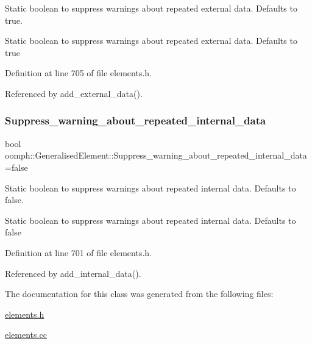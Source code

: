 Static boolean to suppress warnings about repeated external data. Defaults to true. 

Static boolean to suppress warnings about repeated external data. Defaults to true 

Definition at line 705 of file elements.\+h.



Referenced by add\+\_\+external\+\_\+data().

\mbox{\label{classoomph_1_1GeneralisedElement_acbfce11cb0f35821b108be5ec48c76d6}} 
\subsubsection{\texorpdfstring{Suppress\+\_\+warning\+\_\+about\+\_\+repeated\+\_\+internal\+\_\+data}{Suppress\_warning\_about\_repeated\_internal\_data}}
{\footnotesize\ttfamily bool oomph\+::\+Generalised\+Element\+::\+Suppress\+\_\+warning\+\_\+about\+\_\+repeated\+\_\+internal\+\_\+data =false\hspace{0.3cm}{\ttfamily [static]}}



Static boolean to suppress warnings about repeated internal data. Defaults to false. 

Static boolean to suppress warnings about repeated internal data. Defaults to false 

Definition at line 701 of file elements.\+h.



Referenced by add\+\_\+internal\+\_\+data().



The documentation for this class was generated from the following files\+:\begin{DoxyCompactItemize}
\item 
\hyperlink{elements_8h}{elements.\+h}\item 
\hyperlink{elements_8cc}{elements.\+cc}\end{DoxyCompactItemize}
